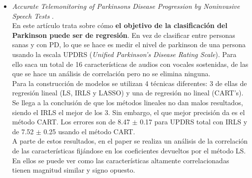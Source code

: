 \begin{itemize}
	\item \textit{Accurate Telemonitoring of Parkinsons Disease Progression by Noninvasive Speech Tests} \cite{MxLtAccurate}.\\
	En este artículo trata sobre cómo \textbf{el objetivo de la clasificación del Parkinson puede ser de regresión}. En vez de clasificar entre personas sanas y con PD, lo que se hace es medir el nivel de parkinson de una persona usando la escala UPDRS (\textit{Unified Parkinson's Disease Rating Scale}). Para ello saca un total de 16 características de audios con vocales sostenidas, de las que se hace un análisis de correlación pero no se elimina ninguna.\\ Para la construcción de modelos se utilizan 4 técnicas diferentes: 3 de ellas de regresión lineal (LS, IRLS y LASSO) y una de regresión no lineal (CART's). Se llega a la conclusión de que los métodos lineales no dan malos resultados, siendo el IRLS el mejor de los 3. Sin embargo, el que mejor precisión da es el método CART. Los errores son de 8.47 $\pm$ 0.17 para UPDRS total con IRLS y de 7.52 $\pm$ 0.25 usando el método CART.\\ A parte de estos resultados, en el paper se realiza un análisis de la correlación de las características fijándose en los coeficientes devueltos por el método LS. En ellos se puede ver como las características altamente correlacionadas tienen magnitud similar y signo opuesto. 
	

\end{itemize}
